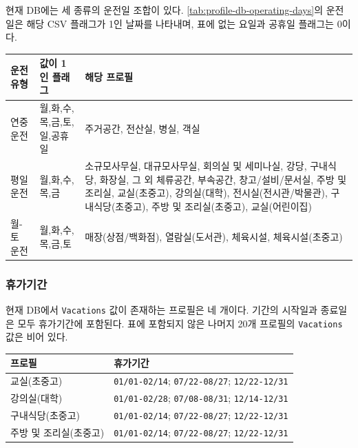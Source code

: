 현재 DB에는 세 종류의 운전일 조합이 있다.
\cref{tab:profile-db-operating-days}의 운전일은 해당 CSV 플래그가 1인 날짜를 나타내며, 표에 없는 요일과 공휴일 플래그는 0이다.

\begin{defaulttable}
  \caption{내장 프로필 DB의 요일 및 공휴일 운전 플래그}
  \label{tab:profile-db-operating-days}
  {\small
  \renewcommand{\arraystretch}{1.12}
  \begin{tabularx}{\textwidth}{p{2.5cm}p{4.5cm}X}
    \toprule
    운전 유형 & 값이 1인 플래그 & 해당 프로필 \\ \midrule

    연중 운전
      & 월,화,수,목,금,토,일,공휴일
      & 주거공간, 전산실, 병실, 객실 \\

    평일 운전
      & 월,화,수,목,금
      & 소규모사무실, 대규모사무실, 회의실 및 세미나실,
        강당, 구내식당, 화장실, 그 외 체류공간, 부속공간,
        창고/설비/문서실, 주방 및 조리실, 교실(초중고),
        강의실(대학), 전시실(전시관/박물관),
        구내식당(초중고), 주방 및 조리실(초중고),
        교실(어린이집) \\

    월-토 운전
      & 월,화,수,목,금,토
      & 매장(상점/백화점), 열람실(도서관), 체육시설,
        체육시설(초중고) \\

    \bottomrule
  \end{tabularx}
  }
\end{defaulttable}

\subsubsection{휴가기간}

현재 DB에서 \texttt{Vacations} 값이 존재하는 프로필은 네 개이다. 기간의 시작일과 종료일은 모두 휴가기간에 포함된다. 표에 포함되지 않은 나머지 20개 프로필의 \texttt{Vacations} 값은 비어 있다.

\begin{defaulttable}
  \caption{내장 프로필 DB의 휴가기간}
  \label{tab:profile-db-vacations}
  {\small
  \begin{tabularx}{\textwidth}{p{5.0cm}X}
    \toprule
    프로필 & 휴가기간 \\ \midrule

    교실(초중고)
      & \texttt{01/01-02/14};
        \texttt{07/22-08/27};
        \texttt{12/22-12/31} \\

    강의실(대학)
      & \texttt{01/01-02/28};
        \texttt{07/08-08/31};
        \texttt{12/14-12/31} \\

    구내식당(초중고)
      & \texttt{01/01-02/14};
        \texttt{07/22-08/27};
        \texttt{12/22-12/31} \\

    주방 및 조리실(초중고)
      & \texttt{01/01-02/14};
        \texttt{07/22-08/27};
        \texttt{12/22-12/31} \\

    \bottomrule
  \end{tabularx}
  }
\end{defaulttable}

